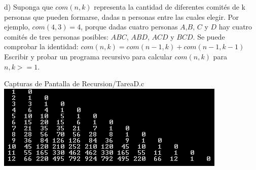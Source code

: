 d) Suponga que $com(n,k)$ representa la cantidad de
diferentes comités de k personas que pueden formarse,
dadas n personas entre las cuales elegir. Por ejemplo,
$com(4,3) = 4$, porque dadas cuatro personas $A$,$B$,
$C$ y $D$ hay cuatro comités de tres personas posibles:
$ABC$, $ABD$, $ACD$ y $BCD$. Se puede comprobar la identidad:
\newline\hspace*{5mm}
$com(n,k) = com(n-1,k) + com(n-1,k-1)$
\newline
Escribir y probar un programa recursivo para calcular
$com(n,k)$ para $n,k >= 1$.

Capturas de Pantalla de Recursion/TareaD.c
\newline
\includegraphics{Recursion/img/TareaD_1.png}